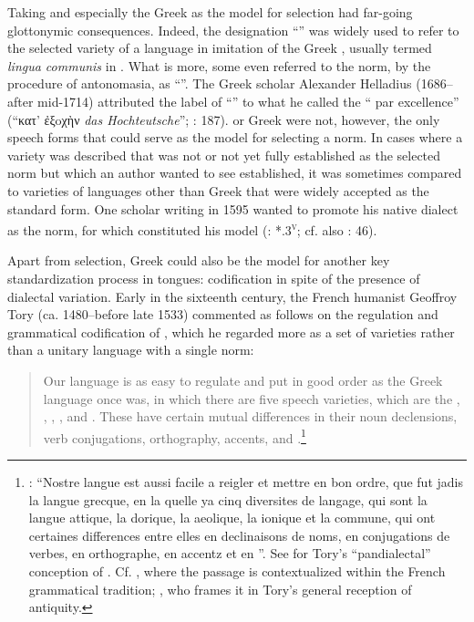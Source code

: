 Taking  and especially the Greek  as the model for selection had far-going glottonymic consequences. Indeed, the designation “” was widely used to refer to the selected variety of a  language in imitation of the Greek , usually termed \textit{lingua communis} in . What is more, some even referred to the  norm, by the procedure of antonomasia, as “”. The Greek scholar Alexander Helladius (1686–after mid-1714) attributed the label of “” to what he called the “ par excellence” (“κατ’ ἐξoχὴν \textit{das Hochteutsche}”; \citealt{Helladius1714}: 187).  or  Greek were not, however, the only speech forms that could serve as the model for selecting a  norm. In cases where a  variety was described that was not or not yet fully established as the selected norm but which an author wanted to see established, it was sometimes compared to varieties of languages other than Greek that were widely accepted as the standard form. One scholar writing in 1595 wanted to promote his native  dialect as the  norm, for which   constituted his model (\citealt{Veranzio1595}: *.3\textsc{\textsuperscript{v}}; cf. also \citealt{Schoppe1636}: 46).

Apart from selection, Greek could also be the model for another key standardization process in  tongues: codification in spite of the presence of dialectal variation. Early in the sixteenth century, the French humanist Geoffroy Tory (ca. 1480–before late 1533) commented as follows on the regulation and grammatical codification of , which he regarded more as a set of varieties rather than a unitary language with a single norm:

\begin{quote}
Our language is as easy to regulate and put in good order as the Greek language once was, in which there are five speech varieties, which are the , , , , and . These have certain mutual differences in their noun declensions, verb conjugations, orthography, accents, and .\footnote{\citet[\textsc{iv}\textsc{\textsuperscript{v}}\textsc{–v}\textsc{\textsuperscript{r}}]{Tory1529}: “Nostre langue est aussi facile a reigler et mettre en bon ordre, que fut jadis la langue grecque, en la quelle ya cinq diversites de langage, qui sont la langue attique, la dorique, la aeolique, la ionique et la commune, qui ont certaines differences entre elles en declinaisons de noms, en conjugations de verbes, en orthographe, en accentz et en ”. See \citet[466--467]{Trudeau1983} for Tory’s “pandialectal” conception of . Cf. \citet[19--20]{Defaux2003}, where the passage is contextualized within the French grammatical tradition; \citet[23]{Cordier2006}, who frames it in Tory’s general reception of antiquity.}
\end{quote}

